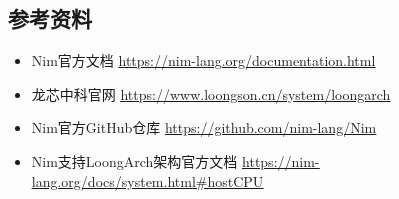\documentclass[UTF8]{ctexart}
\begin{document}
	\subsection{参考资料} %
	\begin{itemize}[leftmargin=3.5em]
		\item Nim官方文档 \underline{\url{https://nim-lang.org/documentation.html}}
		\item 龙芯中科官网 \underline{\url{https://www.loongson.cn/system/loongarch}}
		\item Nim官方GitHub仓库 \underline{\url{https://github.com/nim-lang/Nim}}
		\item Nim支持LoongArch架构官方文档 \underline{\url{https://nim-lang.org/docs/system.html\#hostCPU}}
	\end{itemize}
\end{document}
